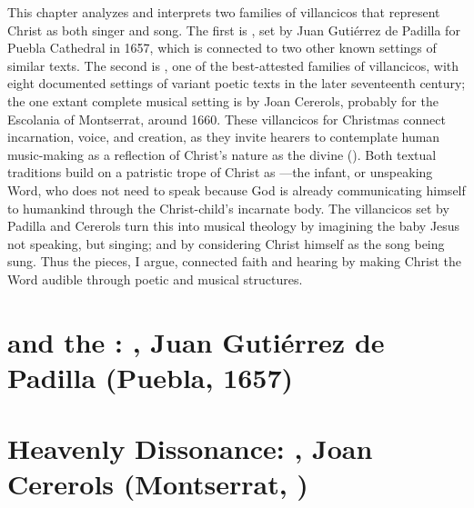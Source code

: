 This chapter analyzes and interprets two families of villancicos that represent
Christ as both singer and song.
The first is , set by Juan Gutiérrez de Padilla
for Puebla Cathedral in 1657, which is connected to two other known settings of
similar texts.
The second is , one of the
best-attested families of villancicos, with eight documented settings of variant
poetic texts in the later seventeenth century; the one extant complete musical
setting is by Joan Cererols, probably for the Escolania of Montserrat, around
1660.
These villancicos for Christmas connect incarnation, voice, and creation, as
they invite hearers to contemplate human music-making as a reflection of
Christ's nature as the divine  ().
Both textual traditions build on a patristic trope of Christ as
---the infant, or unspeaking Word, who does not need to
speak because God is already communicating himself to humankind through the
Christ-child's incarnate body.
The villancicos set by Padilla and Cererols turn this into musical theology by
imagining the baby Jesus not speaking, but singing; and by considering Christ
himself as the song being sung.
Thus the pieces, I argue, connected faith and hearing by making Christ the Word
audible through poetic and musical structures.

\section{%
     and the :
    , Juan Gutiérrez de Padilla (Puebla,
    1657)
}

\section{%
    Heavenly Dissonance: 
    , Joan Cererols
    (Montserrat, )
}


